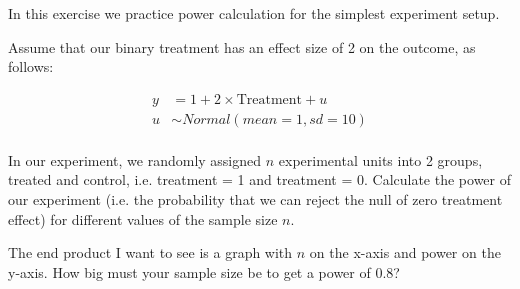\documentclass{article}\usepackage[]{graphicx}\usepackage[]{color}
\begin{document}
In this exercise we practice power calculation for the simplest experiment setup.

Assume that our binary treatment has an effect size of 2 on the outcome, as follows:

$$
\begin{aligned}
y &= 1 + 2 \times \text{Treatment} + u \\
u &\sim Normal(mean = 1, sd = 10) \\
\end{aligned}
$$

In our experiment, we randomly assigned $n$ experimental units into 2 groups, treated and control, i.e. treatment = 1 and treatment = 0. Calculate the power of our experiment (i.e. the probability that we can reject the null of zero treatment effect) for different values of the sample size $n$.

The end product I want to see is a graph with $n$ on the x-axis and power on the y-axis. How big must your sample size be to get a power of 0.8?
\end{document}

